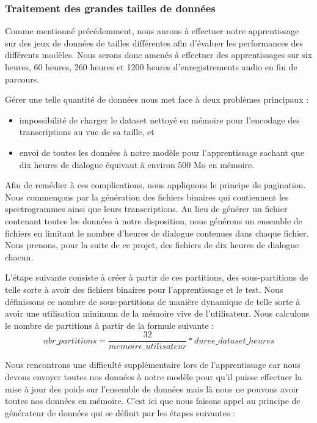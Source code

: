\subsubsection{Traitement des grandes tailles de données}
Comme mentionné précédemment, nous aurons à effectuer notre apprentissage sur des jeux de données de tailles différentes afin d'évaluer les performances des différents modèles. Nous serons donc amenés à effectuer des apprentissages sur six heures, 60 heures, 260 heures et 1200 heures d'enregistrements audio en fin de parcours.

Gérer une telle quantité de données nous met face à deux problèmes principaux : 
\begin{itemize}
    \item impossibilité de charger le dataset nettoyé en mémoire pour l'encodage des transcriptions au vue de sa taille, et
    \item envoi de toutes les données à notre modèle pour l'apprentissage sachant que dix heures de dialogue équivaut à environ 500 Mo en mémoire. \\
\end{itemize}

Afin de remédier à ces complications, nous appliquons le principe de pagination. Nous commençons par la génération des fichiers binaires qui contiennent les spectrogrammes ainsi que leurs transcriptions. Au lieu de générer un fichier contenant toutes les données à notre disposition, nous générons un ensemble de fichiers en limitant le nombre d'heures de dialogue contenues dans chaque fichier. Nous prenons, pour la suite de ce projet, des fichiers de dix heures de dialogue chacun.

L'étape suivante consiste à créer à partir de ces partitions, des sous-partitions de telle sorte à avoir des fichiers binaires pour l'apprentissage et le test. Nous définissons ce nombre de sous-partitions de manière dynamique de telle sorte à avoir une utilisation minimum de la mémoire vive de l'utilisateur. Nous calculons le nombre de partitions à partir de la formule suivante : 
\begin{equation}
    nbr\_partitions = \frac{32}{memoire\_utilisateur} * duree\_dataset\_heures
\end{equation}

Nous rencontrons une difficulté supplémentaire lors de l'apprentissage car nous devons envoyer toutes nos données à notre modèle pour qu'il puisse effectuer la mise à jour des poids sur l'ensemble de données mais là nous ne pouvons avoir toutes nos données en mémoire. C'est ici que nous faisons appel au principe de générateur de données qui se définit par les étapes suivantes : 

